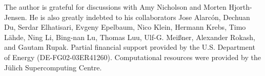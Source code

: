 \begin{acknowledgement}
The author is grateful for discussions with Amy Nicholson and Morten
Hjorth-Jensen.  He is also greatly indebted to his collaborators Jose
Alarc{\'o}n, Dechuan Du, Serdar Elhatisari, Evgeny Epelbaum, Nico
Klein, Hermann Krebs, Timo L{\"a}hde, Ning Li, Bing-nan Lu, Thomas
Luu, Ulf-G. Mei{\ss}ner, Alexander Rokash, and Gautam Rupak.  Partial
financial support provided by the U.S. Department of Energy
(DE-FG02-03ER41260).  Computational resources were provided by the
J\"{u}lich Supercomputing Centre.
\end{acknowledgement}

 

